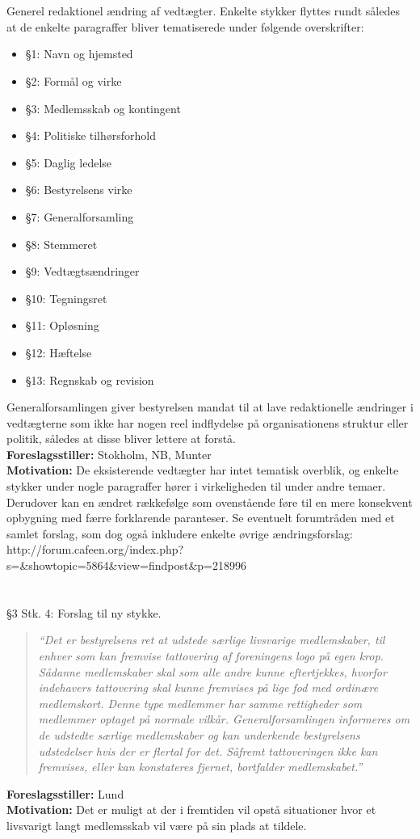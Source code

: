 \documentclass[a4paper,12pt,danish]{article}
\newcommand\cit[1]{
    \begin{quote}
        \textit{``#1''}
    \end{quote}
}
\newcommand\who[1]{
    \textbf{Foreslagsstiller:} #1\\
}
\newcommand\why[1]{
    \textbf{Motivation:} #1\\
}
\newcommand\change[1]{
    \section{}
    #1
}
\begin{document}
\change{
	Generel redaktionel ændring af vedtægter. Enkelte stykker flyttes rundt således at de enkelte paragraffer bliver tematiserede under følgende overskrifter:
    \begin{itemize}
        \item \S1: Navn og hjemsted
        \item \S2: Formål og virke
        \item \S3: Medlemsskab og kontingent
        \item \S4: Politiske tilhørsforhold
        \item \S5: Daglig ledelse
        \item \S6: Bestyrelsens virke
        \item \S7: Generalforsamling
        \item \S8: Stemmeret
        \item \S9: Vedtægtsændringer
        \item \S10: Tegningsret
        \item \S11: Opløsning
        \item \S12: Hæftelse
        \item \S13: Regnskab og revision
    \end{itemize}
    Generalforsamlingen giver bestyrelsen mandat til at lave redaktionelle ændringer i vedtægterne som ikke har nogen reel indflydelse på organisationens struktur eller politik, således at disse bliver lettere at forstå.\\

    \who{Stokholm, NB, Munter}
    \why{De eksisterende vedtægter har intet tematisk overblik, og enkelte stykker under nogle paragraffer hører i virkeligheden til under andre temaer. Derudover kan en ændret rækkefølge som ovenstående føre til en mere konsekvent opbygning med færre forklarende paranteser. Se eventuelt forumtråden med et samlet forslag, som dog også inkludere enkelte øvrige ændringsforslag:\\
    http://forum.cafeen.org/index.php?s=\&showtopic=5864\&view=findpost\&p=218996}
}

\change{
	\S3 Stk. 4:
Forslag til ny stykke.
    \cit{Det er bestyrelsens ret at udstede særlige livsvarige medlemskaber, til enhver som kan fremvise tattovering af foreningens logo på egen krop. Sådanne medlemskaber skal som alle andre kunne eftertjekkes, hvorfor indehavers tattovering skal kunne fremvises på lige fod med ordinære medlemskort. Denne type medlemmer har samme rettigheder som medlemmer optaget på normale vilkår. Generalforsamlingen informeres om de udstedte særlige medlemskaber og kan underkende bestyrelsens udstedelser hvis der er flertal for det. Såfremt tattoveringen ikke kan fremvises, eller kan konstateres fjernet, bortfalder medlemskabet.}
    \who{Lund}
    \why{Det er muligt at der i fremtiden vil opstå situationer hvor et livsvarigt langt medlemsskab vil være på sin plads at tildele.}
}
\end{document}
